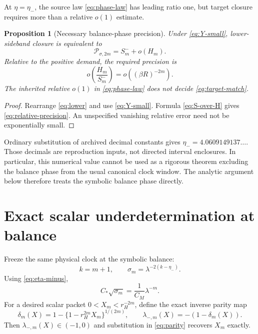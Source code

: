 \documentclass[11pt]{article}
\newtheorem{proposition}[theorem]{Proposition}
\theoremstyle{remark}
\newcommand{\cP}{\mathcal P}
\begin{document}
At $\eta=\eta_-$, the source law \eqref{eq:phase-law} has leading ratio one,
but target closure requires more than a relative $o(1)$ estimate.

\begin{proposition}[Necessary balance-phase precision]
\label{prop:precision}
Under \eqref{eq:Y-small}, lower-sideband closure is equivalent to
\begin{equation}\label{eq:target-match}
 \cP_{\sigma,2m}=S_m^-+o(H_m).
\end{equation}
Relative to the positive demand, the required precision is
\begin{equation}\label{eq:relative-precision}
 o\!\left(\frac{H_m}{S_m^-}\right)
 =o\!\left((\beta R)^{-2m}\right).
\end{equation}
The inherited relative $o(1)$ in \eqref{eq:phase-law} does not decide
\eqref{eq:target-match}.
\end{proposition}

\begin{proof}
Rearrange \eqref{eq:lower} and use \eqref{eq:Y-small}.  Formula
\eqref{eq:S-over-H} gives \eqref{eq:relative-precision}.  An unspecified
vanishing relative error need not be exponentially small.
\end{proof}

Ordinary substitution of archived decimal constants gives
$\eta_-=4.0609149137\ldots$.  Those decimals are reproduction inputs, not
directed interval enclosures.  In particular, this numerical value cannot be
used as a rigorous theorem excluding the balance phase from the usual
canonical clock window.  The analytic argument below therefore treats the
symbolic balance phase directly.

\section{Exact scalar underdetermination at balance}

Freeze the same physical clock at the symbolic balance:
\begin{equation}\label{eq:balance-clock}
 k=m+1,\qquad
 \sigma_m=\lambda^{-2(k-\eta_-)}.
\end{equation}
Using \eqref{eq:eta-minus},
\begin{equation}\label{eq:expected-delta}
 C_*\sqrt{\sigma_m}
 =\frac1{C_M}\lambda^{-m}.
\end{equation}
For a desired scalar packet $0<X_m<r_H^{-2m}$, define the exact inverse
parity map
\begin{equation}\label{eq:inverse}
 \delta_m(X)
 =1-\{1-r_H^{2m}X_m\}^{1/(2m)},\qquad
 \lambda_{-,m}(X)=-(1-\delta_m(X)).
\end{equation}
Then $\lambda_{-,m}(X)\in(-1,0)$ and substitution in \eqref{eq:parity}
recovers $X_m$ exactly.
\end{document}
